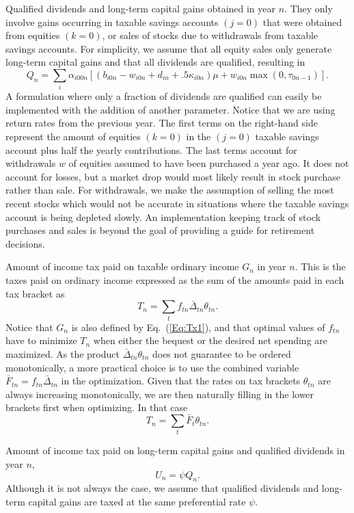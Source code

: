 \documentclass{report}[fleqn,12pt]
\begin{document}
\begin{description}[leftmargin=4em,style=multiline]
\item [$Q_n$]
	Qualified dividends and long-term capital gains obtained in year $n$.
	They only involve gains occurring in taxable savings accounts $(j=0)$ that
	were obtained from equities $(k=0)$, or sales of stocks due to withdrawals
	from taxable savings accounts.
	For simplicity, we assume that all equity sales only generate long-term capital gains and
	that all dividends are qualified, resulting in
	\begin{equation}
		\label{Eq:Qx2}
		Q_n = \sum_{i} \alpha_{i00n}\left[(b_{i0n} - w_{i0n} + d_{in} + .5\kappa_{i0n})\mu +
		w_{i0n}{\max(0, \tau_{0n-1})}\right].
	\end{equation}
	A formulation where only a fraction of dividends are qualified can easily be
	implemented with the addition of another parameter.
	Notice that we are using return rates from the previous year.
	The first terms on the right-hand side represent the amount of equities $(k=0)$ in the $(j=0)$
	taxable savings account plus
	half the yearly contributions. The last terms account for withdrawals $w$ of equities assumed
	to have been purchased a year ago. 
	It does not account for losses, but a market drop
	would most likely result in stock purchase rather than sale.
	For withdrawals, we make the assumption of
	selling the most recent stocks which would not be accurate in situations where
	the taxable savings account is being depleted slowly. An implementation keeping track
	of stock purchases and sales is beyond the goal of providing a guide for retirement decisions.

\item [$T_n$]
	Amount of income tax paid on taxable ordinary income $G_n$ in year $n$.
	This is the taxes paid on ordinary income expressed as the sum of the amounts
	paid in each tax bracket as
	\begin{equation}
		\label{Eq:IncTax0}
		T_n = \sum_t f_{tn}\bar{\Delta}_{tn}\theta_{tn}.
	\end{equation}
	Notice that $G_n$ is also defined by Eq.~(\ref{Eq:Tx1}), and that optimal
	values of $f_{tn}$ have to
	minimize $T_n$ when either the bequest or the desired net spending are maximized.
	As the product $\bar{\Delta}_{tn}\theta_{tn}$ does not guarantee to
	be ordered monotonically, a more practical choice is to use the combined variable
	$\bar{F}_{tn} = f_{tn}\bar{\Delta}_{tn}$ in the optimization. Given that the rates on
	tax brackets $\theta_{tn}$ are always increasing monotonically, we are then naturally
	filling in the lower brackets first when optimizing. In that case
	\begin{equation}
		\label{Eq:IncTax1}
		T_n = \sum_t \bar{F}_t \theta_{tn}.
	\end{equation}
\item [$U_n$]
	Amount of income tax paid on long-term capital gains and qualified dividends in year $n$,
	\begin{equation}
		U_n = \psi Q_n.
	\end{equation}
	Although it is not always the case, we assume that qualified dividends and long-term
	capital gains are taxed at the same preferential rate $\psi$.


\end{description}
\end{document}
